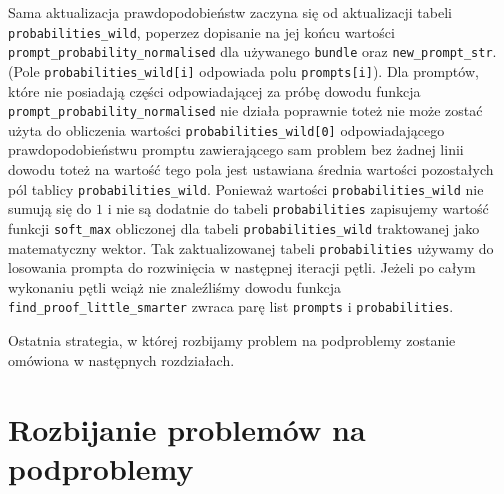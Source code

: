 \documentclass{article}
\begin{document}
Sama aktualizacja prawdopodobieństw zaczyna się od aktualizacji tabeli \texttt{probabilities\_wild}, poperzez dopisanie na jej końcu wartości \texttt{prompt\_probability\_normalised} dla używanego \texttt{bundle}
oraz \texttt{new\_prompt\_str}. (Pole \texttt{probabilities\_wild[i]} odpowiada polu \texttt{prompts[i]}). Dla promptów, które nie posiadają części odpowiadającej za próbę dowodu funkcja \texttt{prompt\_probability\_normalised} 
nie działa poprawnie toteż nie może zostać użyta do obliczenia wartości 
\texttt{probabilities\_wild[0]} odpowiadającego prawdopodobieństwu promptu zawierającego sam problem bez żadnej linii dowodu toteż na wartość tego pola jest ustawiana średnia wartości pozostałych pól tablicy
\texttt{probabilities\_wild}. Ponieważ wartości \texttt{probabilities\_wild} nie sumują się do $1$ i nie są dodatnie do tabeli \texttt{probabilities} zapisujemy wartość funkcji \texttt{soft\_max} obliczonej dla 
tabeli \texttt{probabilities\_wild} traktowanej jako matematyczny wektor. Tak zaktualizowanej tabeli \texttt{probabilities} używamy do losowania prompta do rozwinięcia w następnej iteracji pętli. 
Jeżeli po całym wykonaniu pętli wciąż nie znaleźliśmy dowodu funkcja \texttt{find\_proof\_little\_smarter} zwraca parę list \texttt{prompts} i \texttt{probabilities}.

Ostatnia strategia, w której rozbijamy problem na podproblemy zostanie omówiona w następnych rozdziałach.




\section{Rozbijanie problemów na podproblemy}
\end{document}
